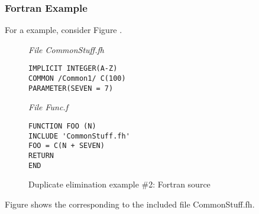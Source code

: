 \subsubsection{Fortran Example}


For a 
example, consider 
Figure .

\begin{figure}[h]
\textit{File CommonStuff.f\hspace{1pt}h}
\begin{lstlisting}[numbers=none]
IMPLICIT INTEGER(A-Z)
COMMON /Common1/ C(100)
PARAMETER(SEVEN = 7)
\end{lstlisting}

\textit{File Func.f}
\begin{lstlisting}[numbers=none]
FUNCTION FOO (N)
INCLUDE 'CommonStuff.fh'
FOO = C(N + SEVEN)
RETURN
END
\end{lstlisting}
\caption{Duplicate elimination example \#2: Fortran source} 
\label{fig:duplicateeliminationexample2fortransource}
\end{figure}


Figure 
shows the 
corresponding to the included file 
CommonStuff.fh.

